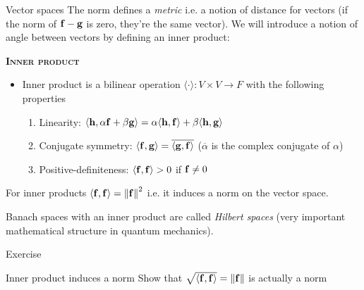 
\begin{frame}{Vector spaces}
	The norm defines a \emph{metric} i.e. a notion of distance for vectors (if the norm of $ \mathbf{f} - \mathbf{g} $ is zero, they're the same vector). We will introduce a notion of angle between vectors by defining an \alert{inner product}:
	
	\textbf{\textsc{Inner product}}
	\begin{itemize}
		\item Inner product is a bilinear operation $ \langle \cdot \rangle : V \times V \to F $ with the following properties
		\begin{enumerate}
			\item Linearity: $ \langle \mathbf{h}, \alpha \mathbf{f} + \beta \mathbf{g} \rangle = \alpha \langle \mathbf{h}, \mathbf{f} \rangle + \beta \langle \mathbf{h}, \mathbf{g} \rangle $
			\item Conjugate symmetry: $ \langle \mathbf{f}, \mathbf{g} \rangle = \overline{\langle \mathbf{g}, \mathbf{f} \rangle} $ ($ \overline{\alpha} $ is the complex conjugate of $ \alpha $)
			\item Positive-definiteness: $ \langle \mathbf{f}, \mathbf{f} \rangle > 0 $ if $ \mathbf{f} \neq 0 $
		\end{enumerate}
	\end{itemize}
For inner products $ \langle \mathbf{f}, \mathbf{f} \rangle = \left\lVert\mathbf{f}\right\rVert^2 $ i.e. it induces a norm on the vector space.

{\color{olive} Banach spaces with an inner product are called \emph{Hilbert spaces} (very important mathematical structure in quantum mechanics).}
\end{frame}


\begin{frame}{Exercise \exercisen}
\centering
	\begin{block}{Inner product induces a norm}
		Show that $ \sqrt{\langle \mathbf{f}, \mathbf{f} \rangle} = \left\lVert\mathbf{f}\right\rVert $ is actually a norm
	\end{block}	
\end{frame}

